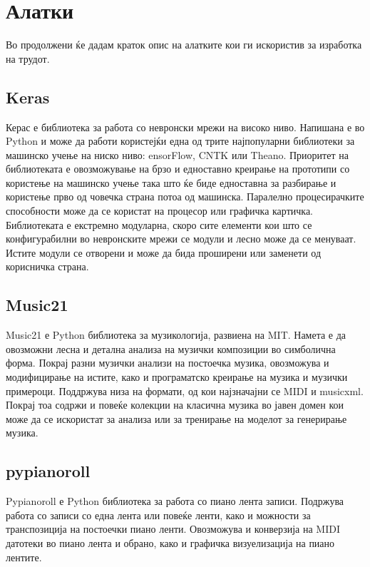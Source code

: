 \chapter{Алатки}
\label{ch:alatki}

Во продолжени ќе дадам краток опис на алатките кои ги искористив за изработка на трудот.

\section{Keras}

Керас е библиотека за работа со невронски мрежи на високо ниво. Напишана е во Python и може да работи користејќи една од трите најпопуларни библиотеки за машинско учење на ниско ниво: ensorFlow, CNTK или Theano. Приоритет на библиотеката е овозможување на брзо и едноставно креирање на прототипи со користење на машинско учење така што ќе биде едноставна за разбирање и користење прво од човечка страна потоа од машинска. Паралелно процесирачките способности може да се користат на процесор или графичка картичка. Библиотеката е екстремно модуларна, скоро сите елементи кои што се конфигурабилни во невронските мрежи се модули и лесно може да се менуваат. Истите модули се отворени и може да бида проширени или заменети од корисничка страна.

\section{Music21}

Music21 е Python библиотека за музикологија, развиена на MIT. Намета е да овозможни лесна и детална анализа на музички композиции во симболична форма. Покрај разни музички анализи на постоечка музика, овозможува и модифицирање на истите, како и програматско креирање на музика и музички примероци. Поддржува низа на формати, од кои најзначајни се MIDI и musicxml. Покрај тоа содржи и повеќе колекции на класична музика во јавен домен кои може да се искористат за анализа или за тренирање на моделот за генерирање музика. 

\section{pypianoroll}

Pypianoroll е Python библиотека за работа со пиано лента записи. Подржува работа со записи со една лента или повеќе ленти, како и можности за транспозиција на постоечки пиано ленти. Овозможува и конверзија на MIDI датотеки во пиано лента и обрано, како и графичка визуелизација на пиано лентите.

